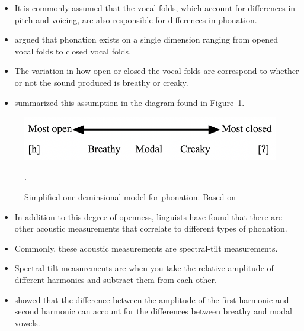 \documentclass[12pt, letterpaper]{article}
\begin{document}
\begin{itemize}
	\item It is commonly assumed that the vocal folds, which account for differences in pitch and voicing, are also responsible for differences in phonation. 
	\item \citet{ladefogedPreliminariesLinguisticPhonetics1971,gordonPhonationTypesCrosslinguistic2001} argued that phonation exists on a single dimension ranging from opened vocal folds to closed vocal folds. 
	\item The variation in how open or closed the vocal folds are correspond to whether or not the sound produced is breathy or creaky. 
	\item \citet{ladefogedPreliminariesLinguisticPhonetics1971,gordonPhonationTypesCrosslinguistic2001} summarized this assumption in the diagram found in Figure~\ref{fig:Phonation}.
\end{itemize}

\begin{figure}[!h]
	\centering
	\includegraphics[width=.6\textwidth]{../Phonation.png}
	\caption{Simplified one-deminsional model for phonation. Based on \citet{ladefogedPreliminariesLinguisticPhonetics1971,gordonPhonationTypesCrosslinguistic2001}}.
	\label{fig:Phonation}
\end{figure}

\begin{itemize}
	\item In addition to this degree of openness, linguists have found that there are other acoustic measurements that correlate to different types of phonation. 
	\item Commonly, these acoustic measurements are spectral-tilt measurements. 
	\item Spectral-tilt measurements are when you take the relative amplitude of different harmonics and subtract them from each other. 
	\item \cite{fischer-jorgensenPhoneticAnalysisBreathy1968} showed that the difference between the amplitude of the first harmonic and second harmonic can account for the differences between breathy and modal vowels. 
\end{itemize}
\end{document}
